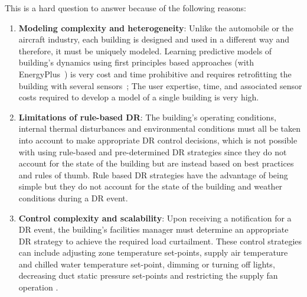 This is a hard question to answer because of the following reasons:
\begin{enumerate}[leftmargin=0.5cm,topsep=1pt,itemsep=-1ex,partopsep=1ex,parsep=1ex]
\item \textbf{Modeling complexity and heterogeneity}: Unlike the automobile or the aircraft industry, each building is designed and used in a different way and therefore, it must be uniquely modeled. 
Learning predictive models of building's dynamics using first principles based approaches (\eg with EnergyPlus~\cite{Crawley2001319}) is very cost and time prohibitive and requires retrofitting the building with several sensors~\cite{costmpc};
The user expertise, time, and associated sensor costs required to develop a model of a single building is very high.
\item \textbf{Limitations of rule-based DR}: The building's operating conditions, internal thermal disturbances and environmental conditions must all be taken into account to make appropriate DR control decisions, which is not possible with using rule-based and pre-determined DR strategies since they do not account for the state of the building but are instead based on best practices and rules of thumb. 
Rule based DR strategies have the advantage of being simple but they do not account for the state of the building and weather conditions during a DR event.
\item \textbf{Control complexity and scalability}: Upon receiving a notification for a DR event, the building's facilities manager must determine an appropriate DR strategy to achieve the required load curtailment. 
These control strategies can include adjusting zone temperature set-points, supply air temperature and chilled water temperature set-point, dimming or turning off lights, decreasing duct static pressure set-points and restricting the supply fan operation \etc. 

\end{enumerate}

